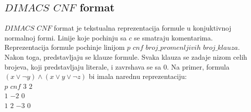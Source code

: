 \documentclass[a4paper,titlepage,12pt]{article}
\begin{document}
\subsection{$DIMACS$ $CNF$ format}

$DIMACS$ $CNF$ format je tekstualna reprezentacija formule u kon\-juktivnoj normalnoj formi. Linije koje pochinju sa $c$ se smatraju komentarima. Reprezentacija formule pochinje linijom $p$ $cnf$ $broj\_promenljivih$ $broj\_klauza$. Nakon toga, predstavljaju se klauze formule. Svaka klauza se zadaje nizom celih brojeva, koji predstavljaju literale, i zavrshava se sa $0$. Na primer, formula $(x \vee \neg y) \wedge (x \vee y \vee \neg z)$ bi imala narednu reprezentaciju:\\

$p$ $cnf$ $3$ $2$\\
\indent $1$ $-2$ $0$\\
\indent $1$ $2$ $-3$ $0$
\end{document}
